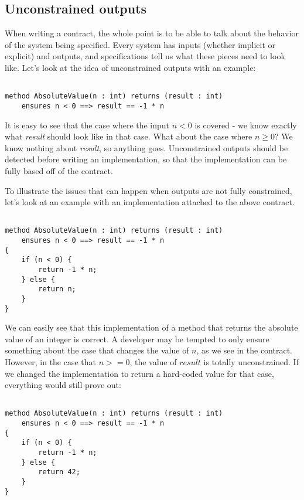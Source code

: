 \documentclass{article}
\begin{document}
\subsection{Unconstrained outputs}

When writing a contract, the whole point is to be able to talk about the behavior of the system being specified.
Every system has inputs (whether implicit or explicit) and outputs, and specifications tell us what these pieces need
to look like. Let’s look at the idea of unconstrained outputs with an example:

\begin{lstlisting}[language=dafny]

method AbsoluteValue(n : int) returns (result : int)
    ensures n < 0 ==> result == -1 * n

\end{lstlisting}

It is easy to see that the case where the input \(n < 0\) is covered - we know exactly what {\it result} should look like in that case. 
What about the case where \(n \geq 0\)? We know nothing about {\it result}, so anything goes. Unconstrained outputs should be detected before 
writing an implementation, so that the implementation can be fully based off of the contract. 

To illustrate the issues that can happen when outputs are not fully constrained, let's look at an example with an implementation attached to the 
above contract.

\begin{lstlisting}[language=dafny]

method AbsoluteValue(n : int) returns (result : int)
    ensures n < 0 ==> result == -1 * n
{
    if (n < 0) {
        return -1 * n;
    } else {
        return n;
    }
}

\end{lstlisting}

We can easily see that this implementation of a method that returns the absolute value of an integer is correct. A developer may be
tempted to only ensure something about the case that changes the value of \(n\), as we see in the contract. However, in the case that \(n >= 0\), the value
of \(result\) is totally unconstrained. If we changed the implementation to return a hard-coded value for that case, everything
would still prove out:

\begin{lstlisting}[language=dafny]

method AbsoluteValue(n : int) returns (result : int)
    ensures n < 0 ==> result == -1 * n
{
    if (n < 0) {
        return -1 * n;
    } else {
        return 42;
    }
}

\end{lstlisting}
\end{document}
